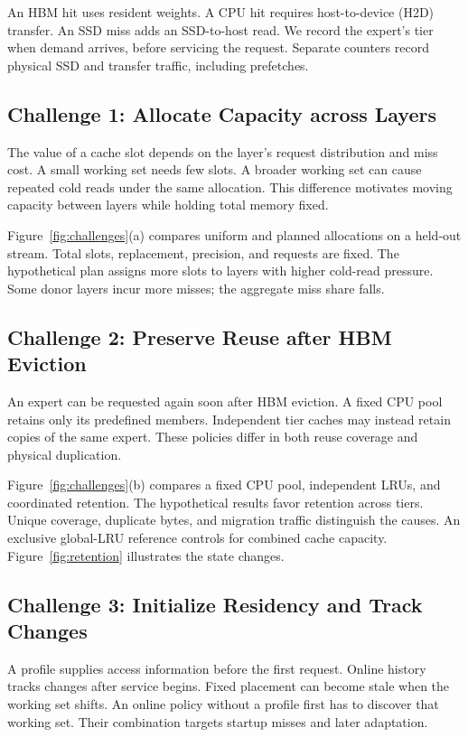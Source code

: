 \documentclass[conference,9pt,letterpaper]{IEEEtran}
\begin{document}
An HBM hit uses resident weights. A CPU hit requires host-to-device (H2D) transfer. An SSD miss adds an SSD-to-host read. We record the expert's tier when demand arrives, before servicing the request. Separate counters record physical SSD and transfer traffic, including prefetches.

\subsection{Challenge 1: Allocate Capacity across Layers}
The value of a cache slot depends on the layer's request distribution and miss cost. A small working set needs few slots. A broader working set can cause repeated cold reads under the same allocation. This difference motivates moving capacity between layers while holding total memory fixed.

Figure~\ref{fig:challenges}(a) compares uniform and planned allocations on a held-out stream. Total slots, replacement, precision, and requests are fixed. The hypothetical plan assigns more slots to layers with higher cold-read pressure. Some donor layers incur more misses; the aggregate miss share falls.

\subsection{Challenge 2: Preserve Reuse after HBM Eviction}
An expert can be requested again soon after HBM eviction. A fixed CPU pool retains only its predefined members. Independent tier caches may instead retain copies of the same expert. These policies differ in both reuse coverage and physical duplication.

Figure~\ref{fig:challenges}(b) compares a fixed CPU pool, independent LRUs, and coordinated retention. The hypothetical results favor retention across tiers. Unique coverage, duplicate bytes, and migration traffic distinguish the causes. An exclusive global-LRU reference controls for combined cache capacity. Figure~\ref{fig:retention} illustrates the state changes.

\subsection{Challenge 3: Initialize Residency and Track Changes}
A profile supplies access information before the first request. Online history tracks changes after service begins. Fixed placement can become stale when the working set shifts. An online policy without a profile first has to discover that working set. Their combination targets startup misses and later adaptation.
\end{document}
